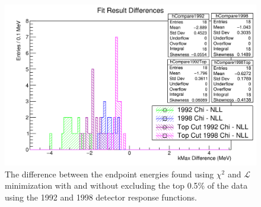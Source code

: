 \begin{figure}[h]
  \centering
  \includegraphics[width=\linewidth]{figures/png/compare_fit_results_92_v_98_with_topCut.png}
  \caption{The difference between the endpoint energies found using $\chi^2$ and
    $\mathcal{L}$ minimization with and without excluding the top 0.5\% of the data
    using the 1992 and 1998 detector response functions.}
  \label{fig:compareFitsTopCut}
\end{figure}







